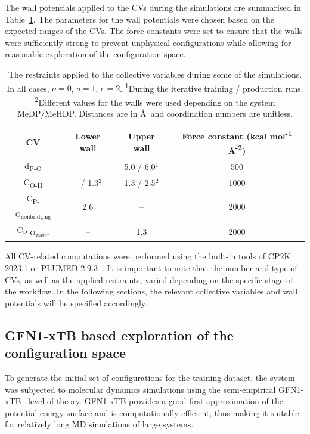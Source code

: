 The wall potentials applied to the CVs during the simulations are summarised in Table~\ref{tab:wall_potentials}. The parameters for the wall potentials were chosen based on the expected ranges of the CVs. The force constants were set to ensure that the walls were sufficiently strong to prevent unphysical configurations while allowing for reasonable exploration of the configuration space.

\begin{table}[b!]
    \centering
    \caption{The restraints applied to the collective variables during some of the simulations. In all cases, $o = 0$, $s = 1$, $e = 2$. \textsuperscript{1}During the iterative training / production runs. \textsuperscript{2}Different values for the walls were used depending on the system MeDP/MeHDP. Distances are in \AA\ and coordination numbers are unitless.}
    \label{tab:wall_potentials}
    \begin{tabular}{cccc}
    \toprule
    \textbf{CV} & \textbf{Lower wall} & \textbf{Upper wall} & \textbf{Force constant (kcal mol\textsuperscript{-1} \AA\textsuperscript{-2})} \\
    \midrule
    d\textsubscript{P-O} & -- & 5.0 / 6.0$^{1}$ & 500  \\
    C\textsubscript{O-H} & -- / 1.3$^{2}$ & 1.3 / 2.5$^{2}$ & 1000 \\
    C\textsubscript{P-O\textsubscript{nonbridging}} & 2.6 & -- & 2000 \\
    C\textsubscript{P-O\textsubscript{water}} & -- & 1.3 & 2000 \\
    \bottomrule
    \end{tabular}
\end{table}

All CV-related computations were performed using the built-in tools of CP2K 2023.1 \citep{kuhneCP2KElectronicStructure2020} or PLUMED 2.9.3~\citep{tribelloPLUMED2New2014}. It is important to note that the number and type of CVs, as well as the applied restraints, varied depending on the specific stage of the workflow. In the following sections, the relevant collective variables and wall potentials will be specified accordingly.



\subsection{GFN1-xTB based exploration of the configuration space}
\label{subsec:xtb-exploration-of-configuration-space}
To generate the initial set of configurations for the training dataset, the system was subjected to molecular dynamics simulations using the semi-empirical GFN1-xTB~\citep{grimmeRobustAccurateTightBinding2017} level of theory. GFN1-xTB provides a good first approximation of the potential energy surface and is computationally efficient, thus making it suitable for relatively long MD simulations of large systems. 

